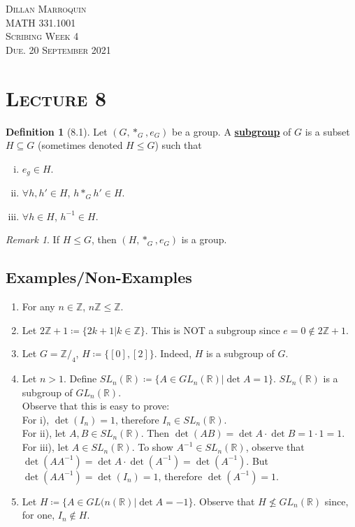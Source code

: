 \documentclass{article}
\newcommand{\Z}{\mathbb{Z}}
\newcommand{\R}{\mathbb{R}}
\newcommand{\coleq}{\coloneqq}
\newcommand{\inverse}[1]{#1^{-1}}
\newcommand{\define}[1]{\textbf{\underline{#1}}}
\newcommand{\Zn}[1]{\mathbb{Z}/_#1}
\theoremstyle{definition}
\newtheorem*{defn}{Definition}
\theoremstyle{remark}
\newtheorem*{rmk}{Remark}
\begin{document}
    \begin{center}
        \textsc{Dillan Marroquin\\MATH 331.1001\\Scribing Week 4\\Due. 20 September 2021\\}
    \end{center}
        
    \noindent\section*{\textbf{\textsc{Lecture 8}}}{
        \begin{defn}[8.1]
            Let $(G, *_G,e_G)$ be a group. A \define{subgroup} of $G$ is a subset $H \subseteq G$ (sometimes denoted $H \leq G$) such that
            \begin{enumerate}[i)]
                \item $e_g \in H$.
                \item $\forall h, h' \in H$, $h *_G h' \in H$.
                \item $\forall h \in H$, $\inverse{h} \in H$.
            \end{enumerate}
        \end{defn}
        
        \begin{rmk}
            If $H \leq G$, then $(H, *_G,e_G)$ is a group.
        \end{rmk}
        
        \subsection*{Examples/Non-Examples}{
            \begin{enumerate}
                \item For any $n \in \Z$, $n\Z \leq \Z$.
                \item Let $2\Z+1 \coleq \{2k+1|k \in \Z\}$. This is NOT a subgroup since $e=0 \notin 2\Z+1$.
                \item Let $G=\Zn{4}$, $H \coleq \{[0],[2]\}$. Indeed, $H$ is a subgroup of $G$.
                \item Let $n>1$. Define $SL_n(\R)\coleq \{A \in GL_n(\R)|\det A=1\}$. $SL_n(\R)$ is a subgroup of $GL_n(\R)$.\\
                Observe that this is easy to prove:\\
                For i), $\det(I_n)=1$, therefore $I_n \in SL_n(\R)$.\\
                For ii), let $A,B \in SL_n(\R)$. Then $\det (AB) = \det A \cdot \det B = 1\cdot 1=1$.\\
                For iii), let $A \in SL_n(\R)$. To show $\inverse{A} \in SL_n(\R)$, observe that $\det(A\inverse{A})=\det A \cdot \det(A^{-1})=\det(\inverse{A})$. But $\det(A\inverse{A})=\det(I_n)=1$, therefore $\det(\inverse{A})=1$.
                \item Let $H\coleq \{A \in GL(n(\R)|\det A =-1\}$. Observe that $H \not \leq GL_n(\R)$ since, for one, $I_n \notin H$.
            \end{enumerate}
            
}}
\end{document}
